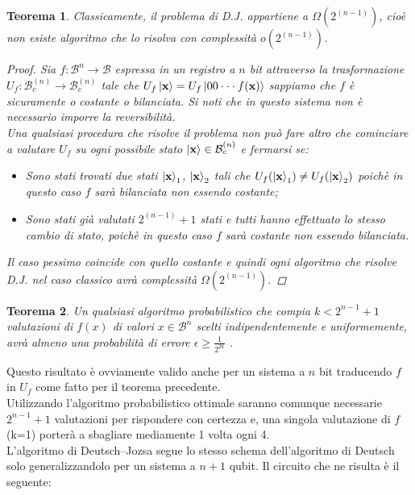 \documentclass[12pt,a4paper,openright]{report}
\newtheorem{mythm}{Teorema}[chapter]
\begin{document}
\begin{mythm}
 Classicamente, il problema di D.J. appartiene a $\Omega(2^{(n-1)})$, cioè non esiste algoritmo che lo risolva con complessità $o(2^{(n-1)})$.
 \begin{proof}
     Sia $f:\mathcal{B}^n\rightarrow\mathcal{B}$ espressa in un registro a $n$ bit attraverso la trasformazione $U_f: \mathcal{B}_c^{(n)} \rightarrow \mathcal{B}_c^{(n)}$ tale che $U_f\ket{\textbf{x}}=U_f\ket{00\cdot\cdot\cdot f(\textbf{x})}$ sappiamo che $f$ è sicuramente o costante o bilanciata.
     Si noti che in questo sistema non è necessario imporre la reversibilità.\\
     Una qualsiasi procedura che risolve il problema non può fare altro che cominciare a valutare $U_f$ su ogni possibile stato $\ket{\textbf{x}}\in{\mathcal{B}_c^{(n)}}$ e fermarsi se:
     \begin{itemize}
         \item Sono stati trovati due stati $\ket{\textbf{x}}_1$, $\ket{\textbf{x}}_2$ tali che $U_f(\ket{\textbf{x}}_1) \ne U_f(\ket{\textbf{x}}_2)$ poichè in questo caso $f$ sarà bilanciata non essendo costante;
         \item Sono stati già valutati $2^{(n-1)}+1$ stati e tutti hanno effettuato lo stesso cambio di stato, poichè in questo caso $f$ sarà costante non essendo bilanciata.
     \end{itemize} 
     Il caso pessimo coincide con quello costante e quindi ogni algoritmo che risolve D.J. nel caso classico avrà complessità $\Omega(2^{(n-1)})$.
 \end{proof}
\end{mythm}

\begin{mythm}
    Un qualsiasi algoritmo probabilistico che compia $k<2^{n-1}+1$ valutazioni di $f(x)$ di valori $x\in\mathcal{B}^n$ scelti indipendentemente e uniformemente, avrà almeno una probabilità di errore $\epsilon \geq \frac{1}{2^{2k}}$ \cite{ref17}. 
\end{mythm}
Questo risultato è ovviamente valido anche per un sistema a $n$ bit traducendo $f$ in $U_f$ come fatto per il teorema precedente.\\
Utilizzando l'algoritmo probabilistico ottimale saranno comunque necessarie $2^{n-1} + 1$ valutazioni per rispondere con certezza e, una singola valutazione di $f$ (k=1) porterà a sbagliare mediamente 1 volta ogni 4.\\

\newpage
L'algoritmo di Deutsch–Jozsa segue lo stesso schema dell'algoritmo di Deutsch solo generalizzandolo per un sistema a $n+1$ qubit. Il circuito che ne risulta è il seguente:
\end{document}
